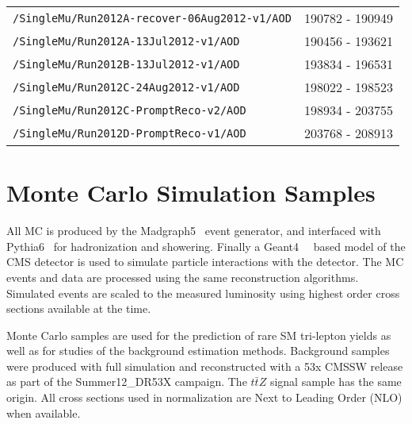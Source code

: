 \begin{table}[hbt]
\begin{center}
\begin{tabular}{lc}
\verb=/SingleMu/Run2012A-recover-06Aug2012-v1/AOD=                    &     190782 - 190949                  \\ 
\verb=/SingleMu/Run2012A-13Jul2012-v1/AOD=                                     &  190456 - 193621                     \\ 
\verb=/SingleMu/Run2012B-13Jul2012-v1/AOD=                                     &  193834 - 196531 \\ 
\verb=/SingleMu/Run2012C-24Aug2012-v1/AOD=                                   &   198022 - 198523                   \\ 
\verb=/SingleMu/Run2012C-PromptReco-v2/AOD=                                  &   198934 - 203755                    \\ 
\verb=/SingleMu/Run2012D-PromptReco-v1/AOD=                                  &  203768 - 208913   \\
 \hline\hline
\end{tabular}

\end{center}
\end{table}

%

	
	
	
	
\section{Monte Carlo Simulation Samples}
\label{sec:MCSamples}

All MC is produced by the Madgraph5~\cite{Alwall:2011uj} event generator, and interfaced with Pythia6~\cite{pythia6} for hadronization and showering. Finally a Geant4~\cite{geant4applications}~\cite{geant4toolkit} based model of the CMS detector is used to simulate particle interactions with the detector. The MC events and data are processed using the same reconstruction algorithms. Simulated events are scaled to the measured luminosity using highest order cross sections available at the time.

Monte Carlo samples are used for the prediction of rare SM tri-lepton yields as well as for studies of the background estimation methods.  
Background samples were produced with full simulation and reconstructed with a 53x CMSSW release as part of the Summer12\_DR53X campaign.
The $t\bar{t}Z$ signal sample has the same origin.    
All cross sections used in normalization are Next to Leading Order (NLO) when available.

